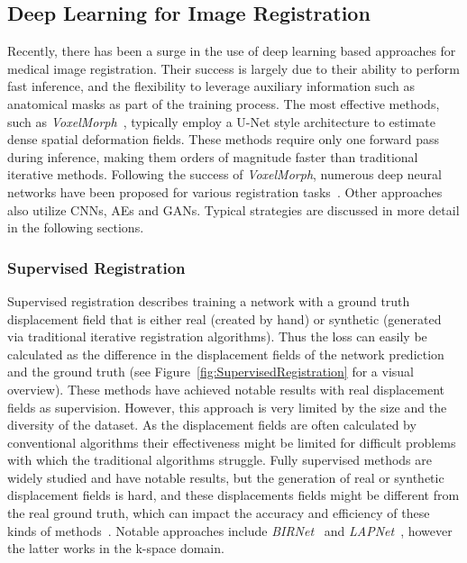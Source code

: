 \subsection{Deep Learning for Image Registration} \label{SubSec:DLImageRegistration}
Recently, there has been a surge in the use of deep learning based approaches for medical image registration. Their success is largely due to their ability to perform fast inference, and the flexibility to leverage auxiliary information such as anatomical masks as part of the training process. The most effective methods, such as \emph{VoxelMorph}~\cite{Voxelmorph}, typically employ a U-Net style architecture to estimate dense spatial deformation fields. These methods require only one forward pass during inference, making them orders of magnitude faster than traditional iterative methods. Following the success of \emph{VoxelMorph}, numerous deep neural networks have been proposed for various registration tasks~\cite{Fourier-Net+}. Other approaches also utilize CNNs, AEs and GANs. Typical strategies are discussed in more detail in the following sections.

\subsubsection{Supervised Registration} \label{SubSubSec:SupervisedRegistration}
Supervised registration describes training a network with a ground truth displacement field that is either real (created by hand) or synthetic (generated via traditional iterative registration algorithms). Thus the loss can easily be calculated as the difference in the displacement fields of the network prediction and the ground truth (see Figure~\ref{fig:SupervisedRegistration} for a visual overview). These methods have achieved notable results with real displacement fields as supervision. However, this approach is very limited by the size and the diversity of the dataset. As the displacement fields are often calculated by conventional algorithms their effectiveness might be limited for difficult problems with which the traditional algorithms struggle. Fully supervised methods are widely studied and have notable results, but the generation of real or synthetic displacement fields is hard, and these displacements fields might be different from the real ground truth, which can impact the accuracy and efficiency of these kinds of methods~\cite{Zou2022}. Notable approaches include \emph{BIRNet}~\cite{BIRNet} and \emph{LAPNet}~\cite{LAPNet}, however the latter works in the k-space domain.

